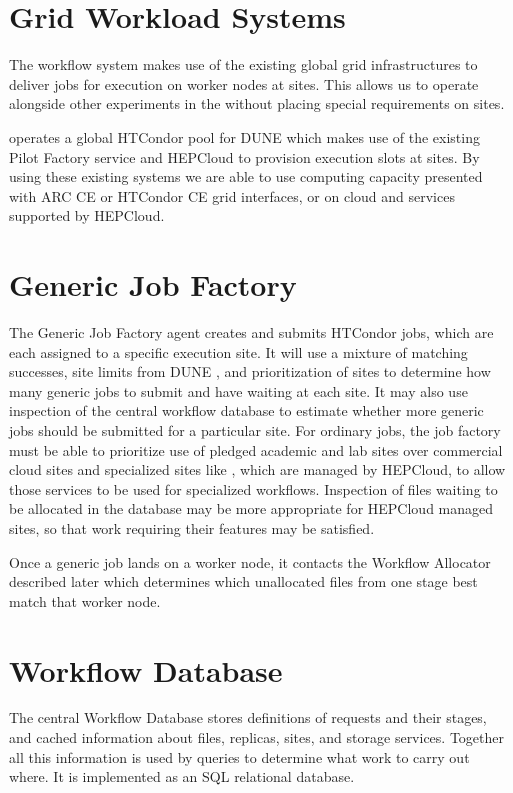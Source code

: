 \documentclass[../main-v1.tex]{subfiles}
\begin{document}
\section{Grid Workload Systems}
\label{sec:flow:grid}

The workflow system makes use of the existing global grid infrastructures to deliver jobs for execution on worker nodes at sites. This allows us to operate alongside other experiments in the  without placing special requirements on sites.

 operates a global HTCondor pool for DUNE which makes use of the existing  Pilot Factory service and HEPCloud to provision execution slots at sites. By using these existing systems we are able to use computing capacity presented with ARC CE or HTCondor CE grid interfaces, or on cloud and  services supported by HEPCloud.

\section{Generic Job Factory}
\label{sec:flow:factory}

The Generic Job Factory agent creates and submits HTCondor jobs, which are each assigned to a specific execution site. It will use a mixture of matching successes, site limits from DUNE , and prioritization of sites to determine how many generic jobs to submit and have waiting at each site. It may also use inspection of the central workflow database to estimate whether more generic jobs should be submitted for a particular site. For ordinary jobs, the job factory must be able to prioritize use of pledged academic and lab sites over commercial cloud sites and specialized sites like , which are managed by HEPCloud, to allow those services to be used for specialized workflows. Inspection of files waiting to be allocated in the database may be more appropriate for HEPCloud managed sites, so that work requiring their features may be satisfied.

Once a generic job lands on a worker node, it contacts the Workflow Allocator described later which determines which unallocated files from one stage best match that worker node.

\section{Workflow Database}
\label{sec:flow:wfdb}

The central Workflow Database stores definitions of requests and their stages, and cached information about files, replicas, sites, and storage services. Together all this information is used by queries to determine what work to carry out where. It is implemented as an SQL relational database.
\end{document}
